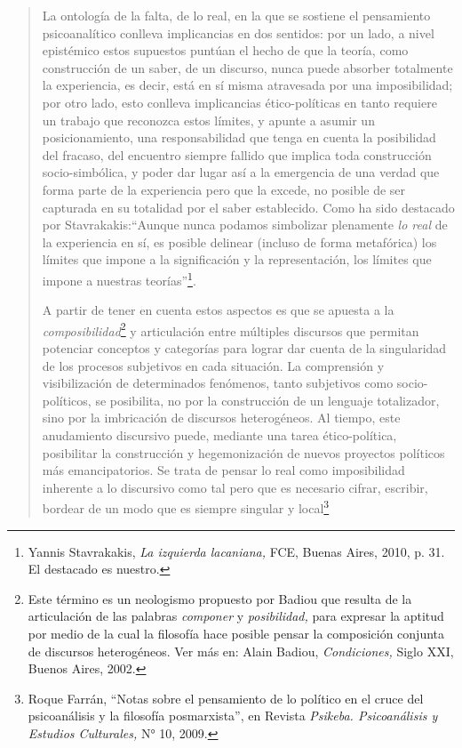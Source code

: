 \begin{quote}
La ontología de la falta, de lo real, en la que se sostiene el pensamiento psicoanalítico conlleva implicancias en dos sentidos: por un lado, a nivel epistémico estos supuestos puntúan el hecho de que la teoría, como construcción de un saber, de un discurso, nunca puede absorber totalmente la experiencia, es decir, está en sí misma atravesada por una imposibilidad; por otro lado, esto conlleva implicancias ético-políticas en tanto requiere un trabajo que reconozca estos límites, y apunte a asumir un posicionamiento, una responsabilidad que tenga en cuenta la posibilidad del fracaso, del encuentro siempre fallido que implica toda construcción socio-simbólica, y poder dar lugar así a la emergencia de una verdad que forma parte de la experiencia pero que la excede, no posible de ser capturada en su totalidad por el saber establecido. Como ha sido destacado por Stavrakakis:\enquote{Aunque nunca podamos simbolizar plenamente \emph{lo real} de la experiencia en sí, es posible delinear (incluso de forma metafórica) los límites que impone a la significación y la representación, los límites que impone a nuestras teorías}\footnote{Yannis Stavrakakis, \emph{La izquierda lacaniana,} FCE, Buenas Aires, 2010, p. 31. El destacado es nuestro.}.

A partir de tener en cuenta estos aspectos es que se apuesta a la \emph{composibilidad}\footnote{Este término es un neologismo propuesto por Badiou que resulta de la articulación de las palabras \emph{componer} y \emph{posibilidad,} para expresar la aptitud por medio de la cual la filosofía hace posible pensar la composición conjunta de discursos heterogéneos. Ver más en: Alain Badiou, \emph{Condiciones,} Siglo XXI, Buenos Aires, 2002.} y articulación entre múltiples discursos que permitan potenciar conceptos y categorías para lograr dar cuenta de la singularidad de los procesos subjetivos en cada situación. La comprensión y visibilización de determinados fenómenos, tanto subjetivos como socio-políticos, se posibilita, no por la construcción de un lenguaje totalizador, sino por la imbricación de discursos heterogéneos. Al tiempo, este anudamiento discursivo puede, mediante una tarea ético-política, posibilitar la construcción y hegemonización de nuevos proyectos políticos más emancipatorios. Se trata de pensar lo real como imposibilidad inherente a lo discursivo como tal pero que es necesario cifrar, escribir, bordear de un modo que es siempre singular y local\footnote{Roque Farrán, \enquote{Notas sobre el pensamiento de lo político en el cruce del psicoanálisis y la filosofía posmarxista}, en Revista \emph{Psikeba. Psicoanálisis y Estudios Culturales,} N° 10, 2009.}


\end{quote}
